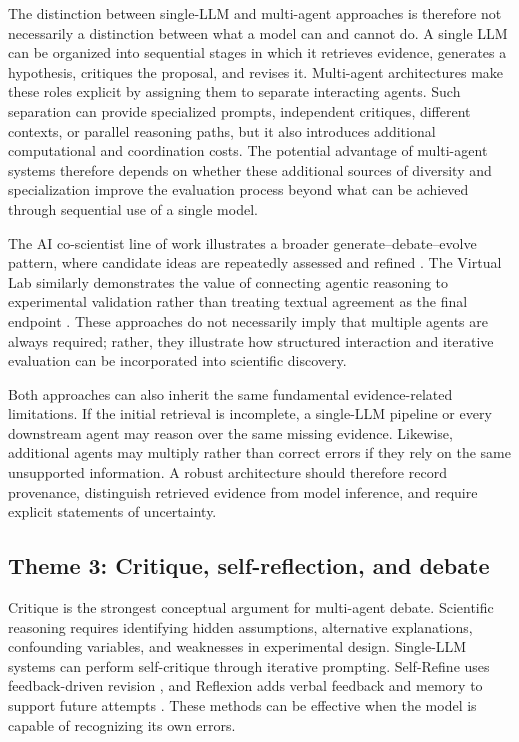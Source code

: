 \documentclass[11pt]{article}
\begin{document}
The distinction between single-LLM and multi-agent approaches is therefore not necessarily a
distinction between what a model can and cannot do. A single LLM can be organized into sequential
stages in which it retrieves evidence, generates a hypothesis, critiques the proposal, and revises
it. Multi-agent architectures make these roles explicit by assigning them to separate interacting
agents. Such separation can provide specialized prompts, independent critiques, different contexts,
or parallel reasoning paths, but it also introduces additional computational and coordination costs.
The potential advantage of multi-agent systems therefore depends on whether these additional
sources of diversity and specialization improve the evaluation process beyond what can be achieved
through sequential use of a single model.

The AI co-scientist line of work illustrates a broader generate--debate--evolve pattern, where
candidate ideas are repeatedly assessed and refined \cite{gottweis2025towards}. The Virtual Lab
similarly demonstrates the value of connecting agentic reasoning to experimental validation rather
than treating textual agreement as the final endpoint \cite{virtuallab2024}. These approaches do
not necessarily imply that multiple agents are always required; rather, they illustrate how
structured interaction and iterative evaluation can be incorporated into scientific discovery.

Both approaches can also inherit the same fundamental evidence-related limitations. If the initial
retrieval is incomplete, a single-LLM pipeline or every downstream agent may reason over the same
missing evidence. Likewise, additional agents may multiply rather than correct errors if they rely
on the same unsupported information. A robust architecture should therefore record provenance,
distinguish retrieved evidence from model inference, and require explicit statements of uncertainty.


\subsection{Theme 3: Critique, self-reflection, and debate}
\label{subsec:critique-debate}

Critique is the strongest conceptual argument for multi-agent debate. Scientific reasoning requires
identifying hidden assumptions, alternative explanations, confounding variables, and weaknesses in
experimental design. Single-LLM systems can perform self-critique through iterative prompting.
Self-Refine uses feedback-driven revision \cite{madaan2023selfrefine}, and Reflexion adds verbal
feedback and memory to support future attempts \cite{shinn2023reflexion}. These methods can be
effective when the model is capable of recognizing its own errors.
\end{document}
